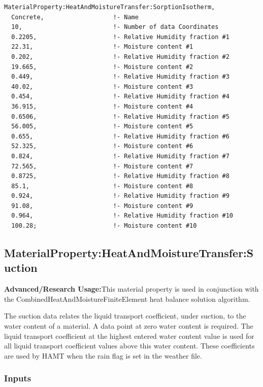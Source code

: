 \begin{lstlisting}
MaterialProperty:HeatAndMoistureTransfer:SorptionIsotherm,
  Concrete,                   !- Name
  10,                         !- Number of data Coordinates
  0.2205,                     !- Relative Humidity fraction #1
  22.31,                      !- Moisture content #1
  0.202,                      !- Relative Humidity fraction #2
  19.665,                     !- Moisture content #2
  0.449,                      !- Relative Humidity fraction #3
  40.02,                      !- Moisture content #3
  0.454,                      !- Relative Humidity fraction #4
  36.915,                     !- Moisture content #4
  0.6506,                     !- Relative Humidity fraction #5
  56.005,                     !- Moisture content #5
  0.655,                      !- Relative Humidity fraction #6
  52.325,                     !- Moisture content #6
  0.824,                      !- Relative Humidity fraction #7
  72.565,                     !- Moisture content #7
  0.8725,                     !- Relative Humidity fraction #8
  85.1,                       !- Moisture content #8
  0.924,                      !- Relative Humidity fraction #9
  91.08,                      !- Moisture content #9
  0.964,                      !- Relative Humidity fraction #10
  100.28;                     !- Moisture content #10
\end{lstlisting}

\subsection{MaterialProperty:HeatAndMoistureTransfer:Suction}\label{materialpropertyheatandmoisturetransfersuction}

\textbf{Advanced/Research Usage:}This material property is used in conjunction with the CombinedHeatAndMoistureFiniteElement heat balance solution algorithm.

The suction data relates the liquid transport coefficient, under suction, to the water content of a material. A data point at zero water content is required. The liquid transport coefficient at the highest entered water content value is used for all liquid transport coefficient values above this water content. These coefficients are used by HAMT when the rain flag is set in the weather file.

\subsubsection{Inputs}\label{inputs-9-022}

